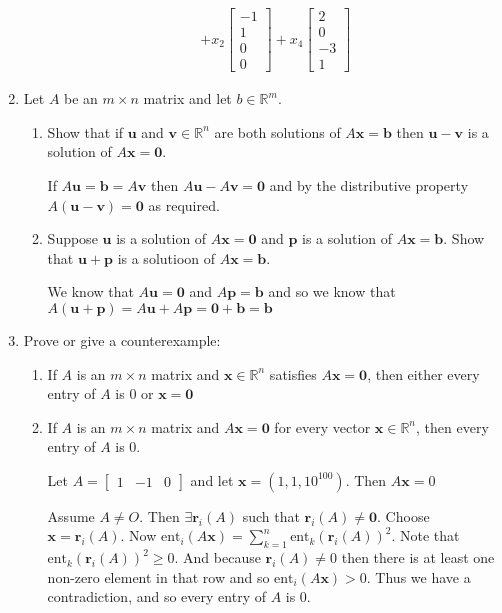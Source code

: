 \documentclass[letterpaper]{article}
\begin{document}
\begin{enumerate}
\begin{enumerate}
\begin{align*}
    +x_2\left[\begin{array}{r}-1\\1\\0\\0\end{array}\right]
    +x_4\left[\begin{array}{r}2\\0\\-3\\1\end{array}\right]
  \end{align*}
  \end{enumerate}
\setcounter{enumi}{13}
\item
Let $A$ be an $m\times n$ matrix and let $b\in \mathbb{R}^m$.
  \begin{enumerate}
  \item
  Show that if $\mathbf{u}$ and $\mathbf{v}\in \mathbb{R}^n$ are both solutions of $A\mathbf{x}=\mathbf{b}$ then $\mathbf{u}-\mathbf{v}$ is a solution of $A\mathbf{x}=\mathbf{0}$.

  If $A\mathbf{u}=\mathbf{b}=A\mathbf{v}$ then $A\mathbf{u}-A\mathbf{v}=\mathbf{0}$ and by the distributive property $A(\mathbf{u}-\mathbf{v})=\mathbf{0}$ as required.
  \item
  Suppose $\mathbf{u}$ is a solution of $A\mathbf{x}=\mathbf{0}$ and $\mathbf{p}$ is a solution of $A\mathbf{x}=\mathbf{b}$. Show that $\mathbf{u}+\mathbf{p}$ is a solutioon of $A\mathbf{x}=\mathbf{b}$.

  We know that $A\mathbf{u}=\mathbf{0}$ and $A\mathbf{p}=\mathbf{b}$ and so we know that $A(\mathbf{u}+\mathbf{p})=A\mathbf{u}+A\mathbf{p}=\mathbf{0}+\mathbf{b}=\mathbf{b}$
  \end{enumerate}
\item
Prove or give a counterexample:
  \begin{enumerate}
  \item
  If $A$ is an $m\times n$ matrix and $\mathbf{x}\in \mathbb{R}^n$ satisfies $A\mathbf{x}=\mathbf{0}$, then either every entry of $A$ is $0$ or $\mathbf{x}=\mathbf{0}$
  \item
  If $A$ is an $m\times n$ matrix and $A\mathbf{x}=\mathbf{0}$ for every vector $\mathbf{x}\in \mathbb{R}^n$, then every entry of $A$ is 0.

  Let $A=\left[\begin{array}{rrr}1&-1&0\end{array}\right]$ and let $\mathbf{x}=(1,1,10^{100})$. Then $A\mathbf{x}=0$

  Assume $A\ne O$. Then $\exists \mathbf{r}_i(A)$ such that $\mathbf{r}_i(A)\ne \mathbf{0}$. Choose $\mathbf{x}=\mathbf{r}_i(A)$. Now $\text{ent}_{i}(A\mathbf{x})=\sum\limits_{k=1}^n{\text{ent}_k(\mathbf{r}_i(A))^2}$. Note that $\text{ent}_k(\mathbf{r}_i(A))^2\ge 0$. And because $\mathbf{r}_i(A)\ne 0$ then there is at least one non-zero element in that row and so $\text{ent}_{i}(A\mathbf{x}) >0$. Thus we have a contradiction, and so every entry of $A$ is 0.
  \end{enumerate}
\end{enumerate}
\end{document}
